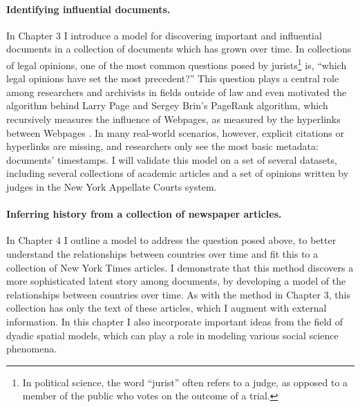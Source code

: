 \paragraph{Identifying influential documents.} In Chapter 3 I
introduce a model for discovering important and influential documents
in a collection of documents which has grown over time.  In
collections of legal opinions, one of the most common questions posed
by jurists\footnote{In political science, the word ``jurist'' often
  refers to a judge, as opposed to a member of the public who votes on
  the outcome of a trial.} is, ``which legal opinions have set the
most precedent?''  This question plays a central role among
researchers and archivists in fields outside of law and even motivated
the algorithm behind Larry Page and Sergey Brin's PageRank algorithm,
which recursively measures the influence of Webpages, as measured by
the hyperlinks between Webpages
\cite{garfield:1992,brin:1998,garfield:2002}.  In many real-world
scenarios, however, explicit citations or hyperlinks are missing, and
researchers only see the most basic metadata: documents' timestamps.
I will validate this model on a set of several datasets, including several collections
of academic articles and a set of opinions written by judges in the
New York Appellate Courts system.

\paragraph{Inferring history from a collection of newspaper articles.}
In Chapter 4 I outline a model to address the question posed above, to
better understand the relationships between countries over time and
fit this to a collection of New York Times articles.  I demonstrate
that this method discovers a more sophisticated latent story among
documents, by developing a model of the relationships between
countries over time.  As with the method in Chapter 3, this collection
has only the text of these articles, which I augment with external
information.  In this chapter I also incorporate important ideas from
the field of dyadic spatial models, which can play a role in modeling
various social science phenomena.


